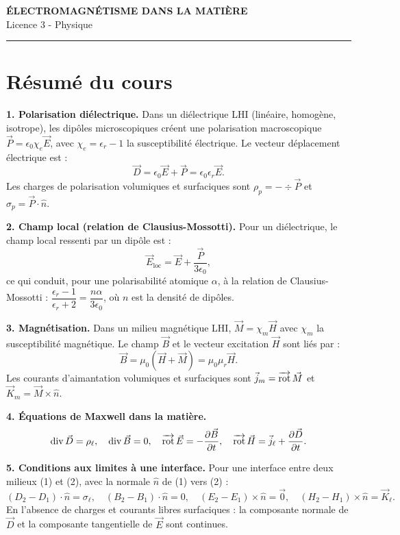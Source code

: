 \documentclass[12pt,a4paper]{article}
\begin{document}
\fi

\begin{center}
  {\LARGE\bfseries ÉLECTROMAGNÉTISME DANS LA MATIÈRE}\\[0.3cm]
  {\normalsize Licence 3 - Physique}\\[0.1cm]
  \rule{0.7\textwidth}{0.8pt}
\end{center}

\section*{Résumé du cours}

\begin{boiteresume}

\textbf{1. Polarisation diélectrique.}
Dans un diélectrique LHI (linéaire, homogène, isotrope), les dipôles microscopiques créent une polarisation macroscopique $\vec{P} = \epsilon_0\chi_e\vec{E}$, avec $\chi_e = \epsilon_r-1$ la susceptibilité électrique. Le vecteur déplacement électrique est :
\[
\vec{D} = \epsilon_0\vec{E} + \vec{P} = \epsilon_0\epsilon_r\vec{E}.
\]
Les charges de polarisation volumiques et surfaciques sont $\rho_p = -\div\vec{P}$ et $\sigma_p = \vec{P}\cdot\hat{n}$.

\textbf{2. Champ local (relation de Clausius-Mossotti).}
Pour un diélectrique, le champ local ressenti par un dipôle est :
\[
\vec{E}_\text{loc} = \vec{E} + \frac{\vec{P}}{3\epsilon_0},
\]
ce qui conduit, pour une polarisabilité atomique $\alpha$, à la relation de Clausius-Mossotti :
$\dfrac{\epsilon_r-1}{\epsilon_r+2} = \dfrac{n\alpha}{3\epsilon_0}$, où $n$ est la densité de dipôles.

\textbf{3. Magnétisation.}
Dans un milieu magnétique LHI, $\vec{M} = \chi_m\vec{H}$ avec $\chi_m$ la susceptibilité magnétique. Le champ $\vec{B}$ et le vecteur excitation $\vec{H}$ sont liés par :
\[
\vec{B} = \mu_0(\vec{H}+\vec{M}) = \mu_0\mu_r\vec{H}.
\]
Les courants d'aimantation volumiques et surfaciques sont $\vec{j}_m = \overrightarrow{\mathrm{rot}}\,\vec{M}$ et $\vec{K}_m = \vec{M}\times\hat{n}$.

\textbf{4. Équations de Maxwell dans la matière.}
\[
\mathrm{div}\,\vec{D} = \rho_\ell, \quad
\mathrm{div}\,\vec{B} = 0, \quad
\overrightarrow{\mathrm{rot}}\,\vec{E} = -\frac{\partial\vec{B}}{\partial t}, \quad
\overrightarrow{\mathrm{rot}}\,\vec{H} = \vec{j}_\ell + \frac{\partial\vec{D}}{\partial t}.
\]

\textbf{5. Conditions aux limites à une interface.}
Pour une interface entre deux milieux (1) et (2), avec la normale $\hat{n}$ de (1) vers (2) :
\[
(D_2-D_1)\cdot\hat{n} = \sigma_\ell, \quad
(B_2-B_1)\cdot\hat{n} = 0, \quad
(E_2-E_1)\times\hat{n} = \vec{0}, \quad
(H_2-H_1)\times\hat{n} = \vec{K}_\ell.
\]
En l'absence de charges et courants libres surfaciques : la composante normale de $\vec{D}$ et la composante tangentielle de $\vec{E}$ sont continues.


\end{boiteresume}
\end{document}
